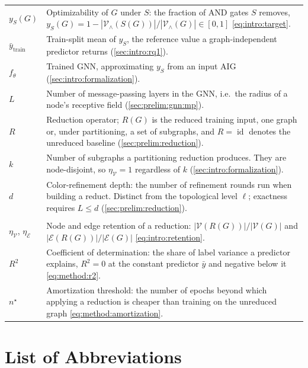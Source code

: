 \begin{table}[h]
\begin{tabular}{@{} l p{} @{}}
$y_S(G)$ & Optimizability of $G$ under $S$: the fraction of AND gates $S$ removes, $y_S(G) = 1 - |\mathcal{V}_{\wedge}(S(G))| / |\mathcal{V}_{\wedge}(G)| \in [0, 1]$ \eqref{eq:intro:target}. \\
$\bar{y}_{\text{train}}$ & Train-split mean of $y_S$, the reference value a graph-independent predictor returns (\ref{sec:intro:rq1}). \\
$f_\theta$ & Trained GNN, approximating $y_S$ from an input AIG (\ref{sec:intro:formalization}). \\
$L$ & Number of message-passing layers in the GNN, i.e.\ the radius of a node's receptive field (\ref{sec:prelim:gnn:mp}). \\
$R$ & Reduction operator; $R(G)$ is the reduced training input, one graph or, under partitioning, a set of subgraphs, and $R = \operatorname{id}$ denotes the unreduced baseline (\ref{sec:prelim:reduction}). \\
$k$ & Number of subgraphs a partitioning reduction produces. They are node-disjoint, so $\eta_{\mathcal{V}} = 1$ regardless of $k$ (\ref{sec:intro:formalization}). \\
$d$ & Color-refinement depth: the number of refinement rounds run when building a reduct. Distinct from the topological level $\ell$; exactness requires $L \leq d$ (\ref{sec:prelim:reduction}). \\
\addlinespace
\multicolumn{2}{@{}l}{\textbf{Measuring reduction}} \\
\midrule
$\eta_{\mathcal{V}}$, $\eta_{\mathcal{E}}$ & Node and edge retention of a reduction: $|\mathcal{V}(R(G))| / |\mathcal{V}(G)|$ and $|\mathcal{E}(R(G))| / |\mathcal{E}(G)|$ \eqref{eq:intro:retention}. \\
$R^{2}$ & Coefficient of determination: the share of label variance a predictor explains, $R^{2} = 0$ at the constant predictor $\bar{y}$ and negative below it \eqref{eq:method:r2}. \\
$n^{\star}$ & Amortization threshold: the number of epochs beyond which applying a reduction is cheaper than training on the unreduced graph \eqref{eq:method:amortization}. \\
\bottomrule
\end{tabular}
\end{table}

\chapter{List of Abbreviations}
\label{sec:list-abbreviations}

